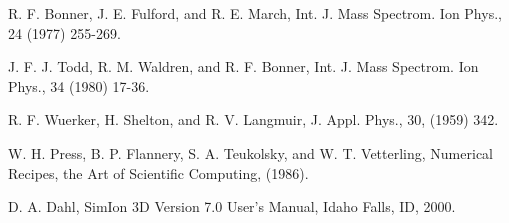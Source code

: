 
\begin{thebibliography}{}
 R. F. Bonner, J. E. Fulford, and R. E. March, Int. J. Mass Spectrom. Ion Phys., 24 (1977) 255-269.

 J. F. J. Todd, R. M. Waldren, and R. F. Bonner, Int. J. Mass Spectrom. Ion Phys., 34 (1980) 17-36.
 
 R. F. Wuerker, H. Shelton, and R. V. Langmuir, J. Appl. Phys., 30, (1959) 342.
 
 W. H. Press, B. P. Flannery, S. A. Teukolsky, and W. T. Vetterling, Numerical Recipes, the Art of Scientific Computing,  (1986).
 
 D. A. Dahl, SimIon 3D Version 7.0 User's Manual, Idaho Falls, ID, 2000.

\end{thebibliography}